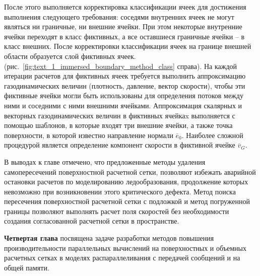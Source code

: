 \documentclass[a4paper,14pt]{extarticle}                     %
\theoremstyle{plain}                                         %
\begin{document}
После этого выполняется корректировка классификации ячеек для достижения выполнения следующего требования: соседями внутренних ячеек не могут являться ни граничные, ни внешние ячейки.
При этом некоторые внутренние ячейки переходят в класс фиктивных, а все оставшиеся граничные ячейки -- в класс внешних.
После корректировки классификации ячеек на границе внешней области образуется слой фиктивных ячеек. (рис.~\ref{fig:text_1_immersed_boundary_method_class} справа).
На каждой итерации расчетов для фиктивных ячеек требуется выполнить аппроксимацию газодинамических величин (плотность, давление, вектор скорости), чтобы эти фиктивные ячейки могли быть использованы для определения потоков между ними и соседними с ними внешними ячейками.
Аппроксимация скалярных и векторных газодинамических величин в фиктивных ячейкаx выполняется с помощью шаблонов, в которые входят три внешние ячейки, а также точка поверхности, в которой известно направление нормали $\overline{e}_0$.
Наиболее сложной процедурой является определение компонент скорости в фиктивной ячейке $\overline{v}_G$.

В выводах к главе отмечено, что предложенные методы удаления самопересечений поверхностной расчетной сетки, позволяют избежать аварийной остановки расчетов по моделированию ледообразования, продолжение которых невозможно при возникновении этого критического дефекта.
Метод поиска пересечения поверхностной расчетной сетки с подложкой и метод погруженной границы позволяют выполнять расчет поля скоростей без необходимости создания согласованной расчетной сетки в пространстве.


\textbf{Четвертая глава} посвящена задаче разработки методов повышения производительности параллельных вычислений на поверхностных и объемных расчетных сетках в моделях распараллеливания с передачей сообщений и на общей памяти.

\end{document}
